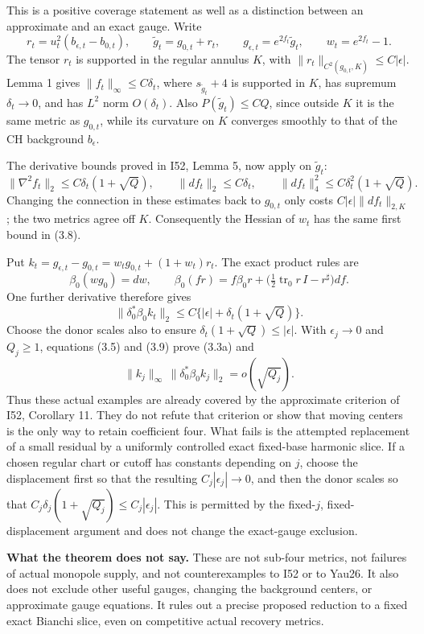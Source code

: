 \documentclass[
  11pt,
]{article}
\begin{document}
This is a positive coverage statement as well as a distinction between
an approximate and an exact gauge. Write \[
 r_t=u_t^2(b_{\epsilon,t}-b_{0,t}),\qquad
 \widetilde g_t=g_{0,t}+r_t,\qquad
 g_{\epsilon,t}=e^{2f_t}\widetilde g_t,\qquad w_t=e^{2f_t}-1.
\] The tensor \(r_t\) is supported in the regular annulus \(K\), with
\(\|r_t\|_{C^2(g_{0,t},K)}\le C|\epsilon|\). Lemma 1 gives
\(\|f_t\|_\infty\le C\delta_t\), where \(s_{\widetilde g_t}+4\) is
supported in \(K\), has supremum \(\delta_t\to0\), and has \(L^2\) norm
\(O(\delta_t)\). Also \(P(\widetilde g_t)\le C Q\), since outside \(K\)
it is the same metric as \(g_{0,t}\), while its curvature on \(K\)
converges smoothly to that of the CH background \(b_\epsilon\).

The derivative bounds proved in I52, Lemma 5, now apply on
\(\widetilde g_t\): \[
 \|\nabla^2 f_t\|_2\le C\delta_t(1+\sqrt Q),\qquad
 \|df_t\|_2\le C\delta_t,\qquad
 \|df_t\|_4^2\le C\delta_t^2(1+\sqrt Q).               \tag{3.8}
\] Changing the connection in these estimates back to \(g_{0,t}\) only
costs \(C|\epsilon|\|df_t\|_{2,K}\); the two metrics agree off \(K\).
Consequently the Hessian of \(w_t\) has the same first bound in (3.8).

Put \(k_t=g_{\epsilon,t}-g_{0,t}  =w_tg_{0,t}+(1+w_t)r_t\). The exact
product rules are \[
 \beta_0(wg_0)=dw,\qquad
 \beta_0(fr)=f\beta_0r+
       \bigl(\tfrac12\operatorname{tr}_0r\,I-r^\sharp\bigr)df .
\] One further derivative therefore gives \[
 \|\delta_0^*\beta_0 k_t\|_2
    \le C\{|\epsilon|+\delta_t(1+\sqrt Q)\}.           \tag{3.9}
\] Choose the donor scales also to ensure
\(\delta_t(1+\sqrt Q)\le|\epsilon|\). With \(\epsilon_j\to0\) and
\(Q_j\ge1\), equations (3.5) and (3.9) prove (3.3a) and \[
 \|k_j\|_\infty\,
       \|\delta_0^*\beta_0 k_j\|_2=o(\sqrt{Q_j}).       \tag{3.10}
\] Thus these actual examples are already covered by the approximate
criterion of I52, Corollary 11. They do not refute that criterion or
show that moving centers is the only way to retain coefficient four.
What fails is the attempted replacement of a small residual by a
uniformly controlled exact fixed-base harmonic slice. If a chosen
regular chart or cutoff has constants depending on \(j\), choose the
displacement first so that the resulting \(C_j|\epsilon_j|\to0\), and
then the donor scales so that
\(C_j\delta_j(1+\sqrt{Q_j})\le C_j|\epsilon_j|\). This is permitted by
the fixed-\(j\), fixed-displacement argument and does not change the
exact-gauge exclusion.

\textbf{What the theorem does not say.} These are not sub-four metrics,
not failures of actual monopole supply, and not counterexamples to I52
or to Yau26. It also does not exclude other useful gauges, changing the
background centers, or approximate gauge equations. It rules out a
precise proposed reduction to a fixed exact Bianchi slice, even on
competitive actual recovery metrics.
\end{document}
